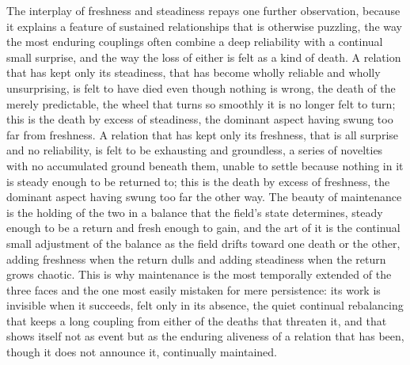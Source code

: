 The interplay of freshness and steadiness repays one further observation, because it explains a feature of sustained relationships that is otherwise puzzling, the way the most enduring couplings often combine a deep reliability with a continual small surprise, and the way the loss of either is felt as a kind of death. A relation that has kept only its steadiness, that has become wholly reliable and wholly unsurprising, is felt to have died even though nothing is wrong, the death of the merely predictable, the wheel that turns so smoothly it is no longer felt to turn; this is the death by excess of steadiness, the dominant aspect having swung too far from freshness. A relation that has kept only its freshness, that is all surprise and no reliability, is felt to be exhausting and groundless, a series of novelties with no accumulated ground beneath them, unable to settle because nothing in it is steady enough to be returned to; this is the death by excess of freshness, the dominant aspect having swung too far the other way. The beauty of maintenance is the holding of the two in a balance that the field's state determines, steady enough to be a return and fresh enough to gain, and the art of it is the continual small adjustment of the balance as the field drifts toward one death or the other, adding freshness when the return dulls and adding steadiness when the return grows chaotic. This is why maintenance is the most temporally extended of the three faces and the one most easily mistaken for mere persistence: its work is invisible when it succeeds, felt only in its absence, the quiet continual rebalancing that keeps a long coupling from either of the deaths that threaten it, and that shows itself not as event but as the enduring aliveness of a relation that has been, though it does not announce it, continually maintained.
